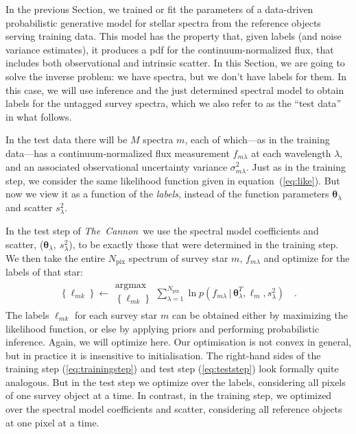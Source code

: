 \documentclass[12pt, preprint]{aastex}
\newcommand{\sectionname}{Section}
\newcommand{\tc}{\textsl{The~Cannon}}
\newcommand{\set}[1]{\bm{#1}}
\newcommand{\starlabel}{\ell}
\newcommand{\starlabelvec}{\set{\starlabel}}
\newcommand{\given}{\,|\,}
\newcommand{\pix}{\mathrm{pix}}
\begin{document}
In the previous Section, we trained or fit the parameters of
a data-driven probabilistic generative model for stellar spectra from the reference objects
serving training data.
This model has the property that, given labels (and noise variance estimates), it produces a
pdf for the continuum-normalized flux, that includes both observational and intrinsic
scatter.
In this \sectionname, we are going to solve the inverse problem:
we have spectra, but we don't have labels for them.
In this case, we will use inference and the just determined spectral model
to obtain labels for the untagged survey
spectra, which we also refer to as the ``test data'' in what follows. 

In the test data there will be $M$ spectra $m$, each of which---as in
the training data---has a continuum-normalized flux measurement
$f_{m\lambda}$ at each wavelength $\lambda$, and an
associated observational uncertainty variance $\sigma_{m\lambda}^2$.
Just as in the training step, we consider the same likelihood function given in
equation~(\ref{eq:like}). But now we view it as a function of the \emph{labels},
instead of the function parameters $\set{\theta}_\lambda$ and
scatter $s_\lambda^2$.

In the test step of \tc\ we use the spectral model coefficients and scatter,
($\set{\theta}_\lambda,\ s_\lambda^2$), to be exactly those that were determined in the training step.
We then take the entire $N_\pix$ spectrum of survey star $m$, $f_{m\lambda}$ and optimize for the labels of that star:
\begin{eqnarray}
\left\{\starlabel_{mk}\right\} \leftarrow \substack{\mbox{argmax}\\{\left\{\starlabel_{mk}\right\}}}
\sum_{\lambda=1}^{N_\pix}
\ln p(f_{m\lambda}\given\set{\theta}^T_\lambda, \starlabelvec_m, s_\lambda^2)
\label{eq:teststep}\quad .
\end{eqnarray}
The labels $\starlabel_{mk}$ for each survey star $m$ can be obtained either by maximizing
the likelihood function, or else by applying priors
and performing probabilistic inference.
Again, we will optimize here. Our optimisation is not convex in general, but in practice it is insensitive to initialisation.
The right-hand sides of the training step (\ref{eq:trainingstep}) and test step (\ref{eq:teststep}) look formally quite analogous.
But in the test step we optimize over the labels, considering all pixels of one survey object at a time. In contrast,
in the training step, we optimized over the spectral model coefficients and scatter, considering all reference objects
at one pixel at a time.
\end{document}
